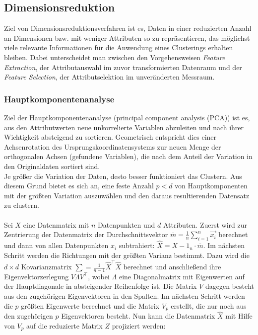 \documentclass[11pt,ceqn]{book}
\begin{document}
\subsection{Dimensionsreduktion}
Ziel von Dimensionsreduktionsverfahren ist es, Daten in einer reduzierten Anzahl an Dimensionen bzw. mit weniger Attributen so zu repräsentieren, das möglichst viele relevante Informationen für die Anwendung eines Clusterings erhalten bleiben. Dabei unterscheidet man zwischen den Vorgehensweisen \textit{Feature Extraction}, der Attributauswahl im zuvor transformierten Datenraum und der \textit{Feature Selection}, der Attributselektion im unveränderten Messraum.

\subsubsection{Hauptkomponentenanalyse}
Ziel der Hauptkomponentenanalyse \cite{pca} (principal component analysis (PCA)) ist es, aus den Attributwerten neue unkorrelierte Variablen abzuleiten und nach ihrer Wichtigkeit absteigend zu sortieren. Geometrisch entspricht dies einer Achsenrotation des Ursprungskoordinatensystems zur neuen Menge der orthogonalen Achsen (gefundene Variablen), die nach dem Anteil der Variation in den Originaldaten sortiert sind.\\

Je größer die Variation der Daten, desto besser funktioniert das Clustern. Aus diesem Grund bietet es sich an, eine feste Anzahl $p<d$ von Hauptkomponenten mit der größten Variation auszuwählen und den daraus resultierenden Datensatz zu clustern.
\\~\\

Sei $X$ eine Datenmatrix mit $n$ Datenpunkten und $d$ Attributen.
Zuerst wird zur Zentrierung der Datenmatrix der Durchschnittsvektor $\overline{m} = \frac{1}{n}\sum\limits_{i=1}^n \vec{x_i}$ berechnet und dann von allen Datenpunkten $x_i$ subtrahiert: $\hat{X} = X - 1_n \cdot \overline{m}$. Im nächsten Schritt werden die Richtungen mit der größten Varianz bestimmt. Dazu wird die $d\times d$ Kovarianzmatrix $\sum=\frac{1}{n-1}\hat{X}^\top \hat{X}$ berechnet und anschließend ihre Eigenvektorzerlegung $V \Lambda V^\top$, wobei $\Lambda$ eine Diagonalmatrix mit Eigenwerten auf der Hauptdiagonale in absteigender Reihenfolge ist. Die Matrix $V$ dagegen besteht aus den zugehörigen Eigenvektoren in den Spalten. Im nächsten Schritt werden die $p$ größten Eigenwerte berechnet und die Matrix $V_p$ erstellt, die nur noch aus den zugehörigen $p$ Eigenvektoren besteht. Nun kann die Datenmatrix $\hat{X}$ mit Hilfe von $V_p$ auf die reduzierte Matrix $Z$ projiziert werden:
\end{document}
